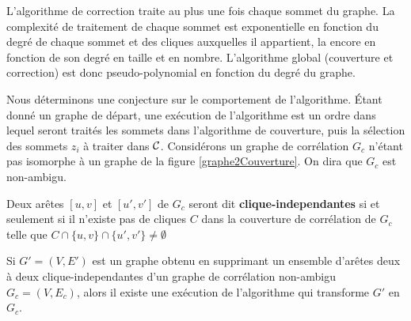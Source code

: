 L'algorithme de correction traite au plus une fois chaque sommet du graphe.
La complexit\'e de traitement de chaque sommet est exponentielle en fonction du degr\'e de chaque sommet et des cliques auxquelles il appartient, la encore en fonction  de son degr\'e en taille et en nombre.
L'algorithme global (couverture et correction) est donc pseudo-polynomial en fonction du degr\'e du graphe.
\newline

Nous d\'eterminons une conjecture sur le comportement de l'algorithme.
\'Etant donn\'e un graphe de d\'epart, une ex\'ecution de l'algorithme est un ordre dans lequel seront trait\'es les sommets dans l'algorithme de couverture, puis
la s\'election des sommets $z_i$ \`a traiter dans  $\cal C$.
\newline
Consid\'erons un graphe de corr\'elation $G_c$ n'\'etant pas isomorphe \`a un graphe de la figure \ref{graphe2Couverture}. On dira que $G_c$ est non-ambigu.

Deux ar\^etes $[u,v]$ et $[u',v']$ de $G_c$ seront dit {\bf clique-independantes} si et seulement si il n'existe pas de cliques $C$ dans la couverture de corr\'elation  de $G_c$ telle que 
$C \cap \{u,v\} \cap \{u',v'\} \ne \emptyset$

\begin{conjecture}
Si $G'=(V, E')$ est un graphe obtenu en supprimant un ensemble d'ar\^etes deux \`a deux clique-independantes d'un graphe de corr\'elation non-ambigu $G_c = (V,E_c)$, alors il existe une ex\'ecution de l'algorithme qui transforme $G'$ en $G_c$.
\end{conjecture}
